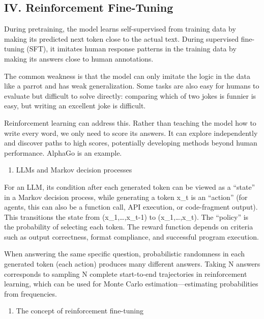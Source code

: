 \hypertarget{iv.-reinforcement-fine-tuning}{%
\subsection{IV. Reinforcement Fine-Tuning}\label{iv.-reinforcement-fine-tuning}}

During pretraining, the model learns self-supervised from training data by making its predicted next token close to the actual text. During supervised fine-tuning (SFT), it imitates human response patterns in the training data by making its answers close to human annotations.

The common weakness is that the model can only imitate the logic in the data like a parrot and has weak generalization. Some tasks are also easy for humans to evaluate but difficult to solve directly: comparing which of two jokes is funnier is easy, but writing an excellent joke is difficult.

Reinforcement learning can address this. Rather than teaching the model how to write every word, we only need to score its answers. It can explore independently and discover paths to high scores, potentially developing methods beyond human performance. AlphaGo is an example.

\begin{enumerate}
\def\labelenumi{\arabic{enumi}.}
\tightlist
\item
  LLMs and Markov decision processes
\end{enumerate}

For an LLM, its condition after each generated token can be viewed as a ``state'' in a Markov decision process, while generating a token x\_t is an ``action'' (for agents, this can also be a function call, API execution, or code-fragment output). This transitions the state from (x\_1,\ldots,x\_t-1) to (x\_1,\ldots,x\_t). The ``policy'' is the probability of selecting each token. The reward function depends on criteria such as output correctness, format compliance, and successful program execution.

When answering the same specific question, probabilistic randomness in each generated token (each action) produces many different answers. Taking N answers corresponds to sampling N complete start-to-end trajectories in reinforcement learning, which can be used for Monte Carlo estimation---estimating probabilities from frequencies.

\begin{enumerate}
\def\labelenumi{\arabic{enumi}.}
\setcounter{enumi}{1}
\tightlist
\item
  The concept of reinforcement fine-tuning
\end{enumerate}

